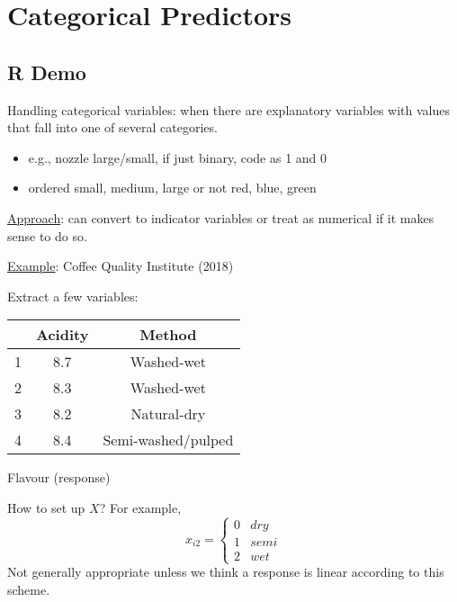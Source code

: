 \section{Categorical Predictors}
\subsection{R Demo}


Handling categorical variables: when there are explanatory
variables with values that fall into one of
several categories.
\begin{itemize}
    \item e.g., nozzle large/small, if just binary,
          code as 1 and 0
    \item ordered small, medium, large or not
          red, blue, green
\end{itemize}
\underline{Approach}: can convert to indicator variables
or treat as numerical if it makes sense to do so.

\underline{Example}: Coffee Quality Institute (2018)

Extract a few variables:
\begin{table}[H]
    \centering
    \begin{NiceTabular}{|c|c|c|}
        \toprule
        & Acidity & Method             \\
         & 8.7     & Washed-wet         \\
        2 & 8.3     & Washed-wet         \\
        3 & 8.2     & Natural-dry        \\
        4 & 8.4     & Semi-washed/pulped\\
        \bottomrule
    \end{NiceTabular}
\end{table}
Flavour (response)

How to set up $ X $? For example,
\[ x_{i2}=\begin{cases*}
        0 & dry  \\
        1 & semi \\
        2 & wet
    \end{cases*} \]
Not generally appropriate unless we think
a response is linear according to this scheme.

